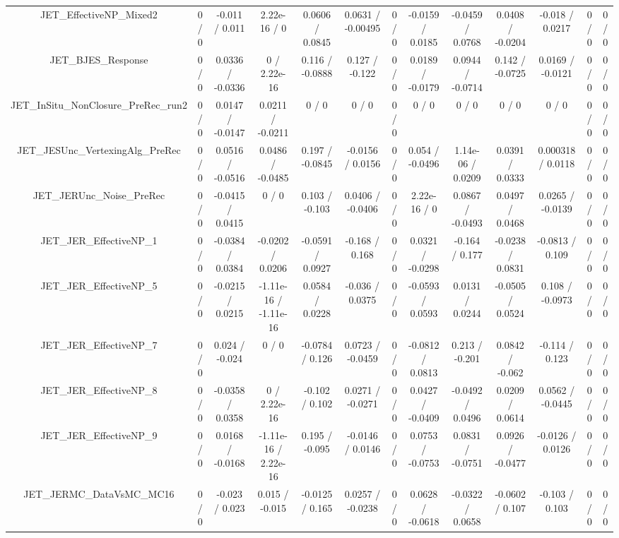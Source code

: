 \documentclass[10pt]{article}
\begin{document}
\begin{table}[htbp]
\begin{center}
\begin{tabular}{|c|c|c|c|c|c|c|c|c|c|c|c|c|}
  JET_EffectiveNP_Mixed2 & 0 / 0 & -0.011 / 0.011 & 2.22e-16 / 0 & 0.0606 / 0.0845 & 0.0631 / -0.00495 & 0 / 0 & -0.0159 / 0.0185 & -0.0459 / 0.0768 & 0.0408 / -0.0204 & -0.018 / 0.0217 & 0 / 0 & 0 / 0 \\ 
  JET_BJES_Response & 0 / 0 & 0.0336 / -0.0336 & 0 / 2.22e-16 & 0.116 / -0.0888 & 0.127 / -0.122 & 0 / 0 & 0.0189 / -0.0179 & 0.0944 / -0.0714 & 0.142 / -0.0725 & 0.0169 / -0.0121 & 0 / 0 & 0 / 0 \\ 
  JET_InSitu_NonClosure_PreRec_run2 & 0 / 0 & 0.0147 / -0.0147 & 0.0211 / -0.0211 & 0 / 0 & 0 / 0 & 0 / 0 & 0 / 0 & 0 / 0 & 0 / 0 & 0 / 0 & 0 / 0 & 0 / 0 \\ 
  JET_JESUnc_VertexingAlg_PreRec & 0 / 0 & 0.0516 / -0.0516 & 0.0486 / -0.0485 & 0.197 / -0.0845 & -0.0156 / 0.0156 & 0 / 0 & 0.054 / -0.0496 & 1.14e-06 / 0.0209 & 0.0391 / 0.0333 & 0.000318 / 0.0118 & 0 / 0 & 0 / 0 \\ 
  JET_JERUnc_Noise_PreRec & 0 / 0 & -0.0415 / 0.0415 & 0 / 0 & 0.103 / -0.103 & 0.0406 / -0.0406 & 0 / 0 & 2.22e-16 / 0 & 0.0867 / -0.0493 & 0.0497 / 0.0468 & 0.0265 / -0.0139 & 0 / 0 & 0 / 0 \\ 
  JET_JER_EffectiveNP_1 & 0 / 0 & -0.0384 / 0.0384 & -0.0202 / 0.0206 & -0.0591 / 0.0927 & -0.168 / 0.168 & 0 / 0 & 0.0321 / -0.0298 & -0.164 / 0.177 & -0.0238 / 0.0831 & -0.0813 / 0.109 & 0 / 0 & 0 / 0 \\ 
  JET_JER_EffectiveNP_5 & 0 / 0 & -0.0215 / 0.0215 & -1.11e-16 / -1.11e-16 & 0.0584 / 0.0228 & -0.036 / 0.0375 & 0 / 0 & -0.0593 / 0.0593 & 0.0131 / 0.0244 & -0.0505 / 0.0524 & 0.108 / -0.0973 & 0 / 0 & 0 / 0 \\ 
  JET_JER_EffectiveNP_7 & 0 / 0 & 0.024 / -0.024 & 0 / 0 & -0.0784 / 0.126 & 0.0723 / -0.0459 & 0 / 0 & -0.0812 / 0.0813 & 0.213 / -0.201 & 0.0842 / -0.062 & -0.114 / 0.123 & 0 / 0 & 0 / 0 \\ 
  JET_JER_EffectiveNP_8 & 0 / 0 & -0.0358 / 0.0358 & 0 / 2.22e-16 & -0.102 / 0.102 & 0.0271 / -0.0271 & 0 / 0 & 0.0427 / -0.0409 & -0.0492 / 0.0496 & 0.0209 / 0.0614 & 0.0562 / -0.0445 & 0 / 0 & 0 / 0 \\ 
  JET_JER_EffectiveNP_9 & 0 / 0 & 0.0168 / -0.0168 & -1.11e-16 / 2.22e-16 & 0.195 / -0.095 & -0.0146 / 0.0146 & 0 / 0 & 0.0753 / -0.0753 & 0.0831 / -0.0751 & 0.0926 / -0.0477 & -0.0126 / 0.0126 & 0 / 0 & 0 / 0 \\ 
  JET_JERMC_DataVsMC_MC16 & 0 / 0 & -0.023 / 0.023 & 0.015 / -0.015 & -0.0125 / 0.165 & 0.0257 / -0.0238 & 0 / 0 & 0.0628 / -0.0618 & -0.0322 / 0.0658 & -0.0602 / 0.107 & -0.103 / 0.103 & 0 / 0 & 0 / 0 \\ 

\end{tabular}
\end{center}
\end{table}
\end{document}
